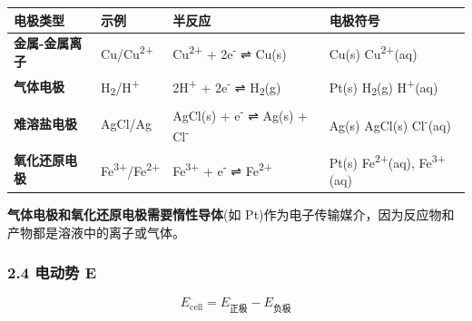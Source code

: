 \documentclass[a4paper,11pt]{ctexart}
\newcounter{none}
\begin{document}
{\def\LTcaptype{none} %
\begin{longtable}[]{@{}
  >{\raggedright\arraybackslash}p{}
  >{\raggedright\arraybackslash}p{}
  >{\raggedright\arraybackslash}p{}
  >{\raggedright\arraybackslash}p{}@{}}
\toprule\noalign{}
\begin{minipage}[b]{\linewidth}\raggedright
电极类型
\end{minipage} & \begin{minipage}[b]{\linewidth}\raggedright
示例
\end{minipage} & \begin{minipage}[b]{\linewidth}\raggedright
半反应
\end{minipage} & \begin{minipage}[b]{\linewidth}\raggedright
电极符号
\end{minipage} \\
\midrule\noalign{}
\endhead
\bottomrule\noalign{}
\endlastfoot
\textbf{金属-金属离子} & Cu/Cu\textsuperscript{2+} & Cu\textsuperscript{2+} + 2e\textsuperscript{-} ⇌ Cu(s) & Cu(s) \textbar{} Cu\textsuperscript{2+}(aq) \\
\textbf{气体电极} & H\textsubscript{2}/H\textsuperscript{+} & 2H\textsuperscript{+} + 2e\textsuperscript{-} ⇌ H\textsubscript{2}(g) & Pt(s) \textbar{} H\textsubscript{2}(g) \textbar{} H\textsuperscript{+}(aq) \\
\textbf{难溶盐电极} & AgCl/Ag & AgCl(s) + e\textsuperscript{-} ⇌ Ag(s) + Cl\textsuperscript{-} & Ag(s) \textbar{} AgCl(s) \textbar{} Cl\textsuperscript{-}(aq) \\
\textbf{氧化还原电极} & Fe\textsuperscript{3+}/Fe\textsuperscript{2+} & Fe\textsuperscript{3+} + e\textsuperscript{-} ⇌ Fe\textsuperscript{2+} & Pt(s) \textbar{} Fe\textsuperscript{2+}(aq), Fe\textsuperscript{3+}(aq) \\
\end{longtable}
}

\textbf{气体电极和氧化还原电极需要惰性导体}(如 Pt)作为电子传输媒介，因为反应物和产物都是溶液中的离子或气体。

\subsubsection{2.4 电动势 E}\label{ux7535ux52a8ux52bf-e}

\[
E_{\text{cell}} = E_{\text{正极}} - E_{\text{负极}}
\]
\end{document}
